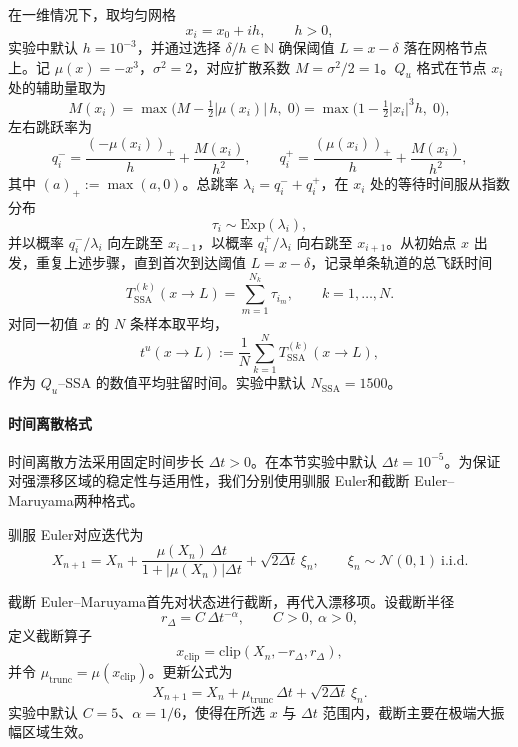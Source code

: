 在一维情况下，取均匀网格
\[
x_i = x_0 + i h,\qquad h>0,
\]
实验中默认 \(h=10^{-3}\)，并通过选择 \(\delta/h\in\mathbb{N}\) 确保阈值 \(L=x-\delta\) 落在网格节点上。记 \(\mu(x)=-x^3\)，\(\sigma^2=2\)，对应扩散系数 \(M=\sigma^2/2=1\)。\(Q_{u}\) 格式在节点 \(x_i\) 处的辅助量取为
\begin{equation}\label{eq:M-def-num}
	M(x_i)
	= \max\!\Big( M - \tfrac12|\mu(x_i)|\,h,\; 0\Big)
	= \max\!\Big( 1 - \tfrac12|x_i|^{3}h,\; 0\Big),
\end{equation}
左右跳跃率为
\begin{equation}\label{eq:qpm-num}
	q_i^- = \frac{(-\mu(x_i))_+}{h} + \frac{M(x_i)}{h^2},\qquad
	q_i^+ = \frac{(\mu(x_i))_+}{h} + \frac{M(x_i)}{h^2},
\end{equation}
其中 \((a)_+ := \max(a,0)\)。总跳率 \(\lambda_i = q_i^-+q_i^+\)，在 \(x_i\) 处的等待时间服从指数分布
\[
\tau_i\sim\mathrm{Exp}(\lambda_i),
\]
并以概率 \(q_i^-/\lambda_i\) 向左跳至 \(x_{i-1}\)，以概率 \(q_i^+/\lambda_i\) 向右跳至 \(x_{i+1}\)。从初始点 \(x\) 出发，重复上述步骤，直到首次到达阈值 \(L=x-\delta\)，记录单条轨道的总飞跃时间
\[
T^{(k)}_{\mathrm{SSA}}(x\to L)
= \sum_{m=1}^{N_k}\tau_{i_m},\qquad k=1,\dots,N.
\]
对同一初值 \(x\) 的 \(N\) 条样本取平均，
\[
t^u(x\to L)
:= \frac{1}{N}\sum_{k=1}^{N}
T^{(k)}_{\mathrm{SSA}}(x\to L),
\]
作为 \(Q_{u}\)–SSA 的数值平均驻留时间。实验中默认 \(N_{\mathrm{SSA}}=1500\)。

\paragraph{时间离散格式}

时间离散方法采用固定时间步长 \(\Delta t>0\)。在本节实验中默认 \(\Delta t=10^{-5}\)。为保证对强漂移区域的稳定性与适用性，我们分别使用驯服 Euler和截断 Euler–Maruyama两种格式。

驯服 Euler对应迭代为
\begin{equation}\label{eq:tamed-EM-num}
	X_{n+1}
	= X_n
	+ \frac{\mu(X_n)\,\Delta t}{1+|\mu(X_n)|\Delta t}
	+ \sqrt{2\Delta t}\,\xi_n,\qquad
	\xi_n\sim\mathcal{N}(0,1)\ \text{i.i.d.}
\end{equation}

截断 Euler–Maruyama首先对状态进行截断，再代入漂移项。设截断半径
\[
r_\Delta = C\,\Delta t^{-\alpha},\qquad C>0,\ \alpha>0,
\]
定义截断算子
\[
x_{\mathrm{clip}} = \mathrm{clip}(X_n,-r_\Delta,r_\Delta),
\]
并令 \(\mu_{\mathrm{trunc}} = \mu(x_{\mathrm{clip}})\)。更新公式为
\begin{equation}\label{eq:trunc-EM-num}
	X_{n+1}
	= X_n
	+ \mu_{\mathrm{trunc}}\,\Delta t
	+ \sqrt{2\Delta t}\,\xi_n.
\end{equation}
实验中默认 \(C=5\)、\(\alpha=1/6\)，使得在所选 \(x\) 与 \(\Delta t\) 范围内，截断主要在极端大振幅区域生效。%

